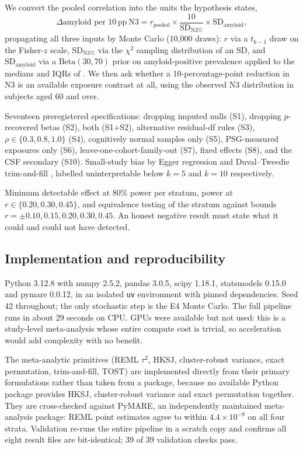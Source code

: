  We convert the pooled correlation into the units the
hypothesis states,
\begin{equation}
\Delta\mathrm{amyloid} \text{ per } 10\,\mathrm{pp\ N3}
= r_{\mathrm{pooled}} \times \frac{10}{\mathrm{SD}_{\mathrm{N3\%}}}
\times \mathrm{SD}_{\mathrm{amyloid}},
\label{eq:dose}
\end{equation}
propagating all three inputs by Monte Carlo (10{,}000 draws): $r$ via a $t_{k-1}$ draw on the
Fisher-$z$ scale, $\mathrm{SD}_{\mathrm{N3\%}}$ via the $\chi^2$ sampling distribution of an SD,
and $\mathrm{SD}_{\mathrm{amyloid}}$ via a $\mathrm{Beta}(30,70)$ prior on amyloid-positive
prevalence applied to the medians and IQRs of \citet{jack2017}. We then ask whether a
10-percentage-point reduction in N3 is an available exposure contrast at all, using the observed
N3 distribution in \sleepedf subjects aged 60 and over.

 Seventeen preregistered specifications: dropping imputed nulls
(S1), dropping $p$-recovered betas (S2), both (S1+S2), alternative residual-df rules (S3),
$\rho \in \{0.3, 0.8, 1.0\}$ (S4), cognitively normal samples only (S5), PSG-measured exposures
only (S6), leave-one-cohort-family-out (S7), fixed effects (S8), and the CSF secondary (S10).
Small-study bias by Egger regression \citep{egger1997} and Duval--Tweedie trim-and-fill
\citep{duval2000}, labelled uninterpretable below $k = 5$ and $k = 10$ respectively.

 Minimum detectable effect at 80\% power per stratum, power at
$r \in \{0.20, 0.30, 0.45\}$, and equivalence testing \citep{lakens2017} of the \stage stratum
against bounds $r = \pm 0.10, 0.15, 0.20, 0.30, 0.45$. An honest negative result must state what
it could and could not have detected.

\subsection{Implementation and reproducibility}
\label{sec:impl}

Python 3.12.8 with numpy 2.5.2, pandas 3.0.5, scipy 1.18.1, statsmodels 0.15.0 and pymare
0.0.12, in an isolated \texttt{uv} environment with pinned dependencies. Seed 42 throughout;
the only stochastic step is the E4 Monte Carlo. The full pipeline runs in about 29 seconds on
CPU. GPUs were available but not used: this is a study-level meta-analysis whose entire compute
cost is trivial, so acceleration would add complexity with no benefit.

The meta-analytic primitives (REML $\tau^2$, HKSJ, cluster-robust variance, exact permutation,
trim-and-fill, TOST) are implemented directly from their primary formulations rather than taken
from a package, because no available Python package provides HKSJ, cluster-robust variance and
exact permutation together. They are cross-checked against PyMARE, an independently maintained
meta-analysis package: REML point estimates agree to within $4.4 \times 10^{-9}$ on all four
strata. Validation re-runs the entire pipeline in a scratch copy and confirms all eight result
files are bit-identical; 39 of 39 validation checks pass.
